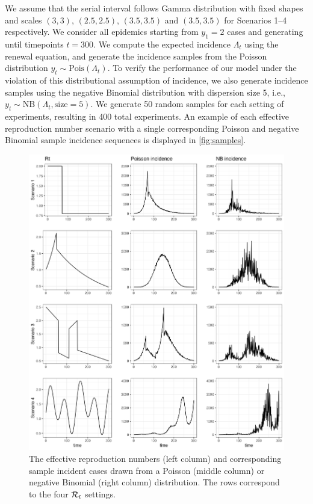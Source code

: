 We assume that the serial interval follows Gamma distribution with fixed shapes
and scales $(3,3)$, $(2.5,2.5)$, $(3.5,3.5)$ and $(3.5,3.5)$ for Scenarios 1--4
respectively. We consider all epidemics starting from $y_1=2$ cases and
generating until timepoints $t=300$. We compute the expected incidence
$\Lambda_t$ using the renewal equation, and generate the incidence samples from
the Poisson distribution $y_t\sim \textrm{Pois}(\Lambda_t)$. To verify the
performance of our model under the violation of this distributional assumption
of incidence, we also generate incidence samples using the negative Binomial
distribution with dispersion size 5, i.e., $y_t\sim \textrm{NB}(\Lambda_t,
\textrm{size}=5)$. We generate 50 random samples for each setting of
experiments, resulting in 400 total experiments. An example of each effective
reproduction number scenario with a single corresponding Poisson and negative
Binomial sample incidence sequences is displayed in \autoref{fig:samples}. 

\begin{figure}[hp!]
    \centering
    \includegraphics[width=.9\textwidth]{fig/plot_samples.png}
    \caption{The effective reproduction numbers (left column) and corresponding
    sample incident cases drawn from a  Poisson (middle column) or negative
    Binomial (right column) distribution. The rows correspond to the four
    $\mathcal{R}_t$ settings.} 
    \label{fig:samples}
\end{figure}

